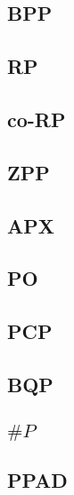 \documentclass[]{article}
\theoremstyle{definition}
\begin{document}
\subsection{BPP}

\subsection{RP}

\subsection{co-RP}

\subsection{ZPP}

\subsection{APX}

\subsection{PO}

\subsection{PCP}

\subsection{BQP}

\subsection{$\# P$}

\subsection{PPAD}
\end{document}
